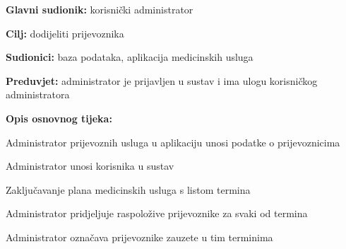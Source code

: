                         \noindent {}
					\begin{packed_item}
	
						\item \textbf{Glavni sudionik: }korisnički administrator
						\item  \textbf{Cilj:} dodijeliti prijevoznika
						\item  \textbf{Sudionici:} baza podataka, aplikacija medicinskih usluga
						\item  \textbf{Preduvjet:} administrator je prijavljen u sustav i ima ulogu korisničkog administratora 
						\item  \textbf{Opis osnovnog tijeka:}
						
						\item[] \begin{packed_enum}
	
							\item Administrator prijevoznih usluga u aplikaciju unosi podatke o prijevoznicima
                                \item Administrator unosi korisnika u sustav
                                \item Zaključavanje plana medicinskih usluga s listom termina
                                \item Administrator pridjeljuje raspoložive prijevoznike za svaki od termina
                                \item Administrator označava prijevoznike zauzete u tim terminima
						\end{packed_enum}
						
					\end{packed_item}

     				

